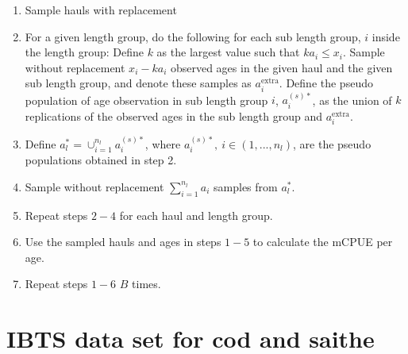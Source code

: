 \documentclass[a4paper 12pt]{article}
\numberwithin{equation}{section}
\begin{document}
\begin{enumerate}
\item Sample hauls with replacement
\item For a given length group, do the following for each sub length group, $i$ inside the length group: Define $k$ as the largest value such that $ka_{i} \leq x_{i}$. Sample without replacement $x_{i} - k a_{i}$ observed ages in the given haul and the given sub length group, and denote these samples as $a^{\mathrm{extra}}_{i}$. Define the pseudo population of age observation in sub length group $i$, $a^{(s)*}_{i}$, as the union of $k$ replications of the observed ages in the sub length group and $a^{\mathrm{extra}}_{i}$.

\item Define $a^{*}_{l} = \cup_{i = 1}^{n_{l}} a^{(s)*}_{i} $, where $a^{(s)*}_{i}, \ i \in \left(1,...,n_{l} \right)$, are the pseudo populations obtained in step 2.

\item Sample without replacement $\sum_{i = 1}^{n_{l}} a_{i}$ samples from $a^{*}_{l} $.

\item Repeat steps $2-4$ for each haul and length group.
\item Use the sampled hauls and ages in steps $1-5$ to calculate the mCPUE per age.
\item Repeat steps $1-6$ $B$ times.
\end{enumerate}

\clearpage
\section{\large IBTS data set for cod and saithe}
\label{secAp:data}
\end{document}
